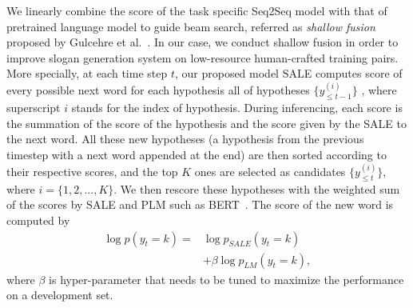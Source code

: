 {We linearly combine the score of the
task specific Seq2Seq model with that of pretrained language model
to guide beam search, referred as \emph{shallow fusion} proposed by
Gulcehre et al.~\cite{gulcehre2015using}.
In our case, we conduct shallow fusion in order to improve slogan generation system
on low-resource human-crafted training pairs. 
More specially, 
at each time step $t$,
our proposed model SALE computes score of every
possible next word for each hypothesis all of hypotheses $\{y^{(i)}_{\le t-1}\}$
, where superscript $i$ stands for the index of hypothesis.
During inferencing, 
each score is the summation of the score of the hypothesis and
the score given by the SALE to the next word.
All these new hypotheses (a hypothesis from the previous timestep with 
a next word appended at the end) are then sorted according to their
respective scores, and the top $K$ ones are selected as candidates
$\{y^{(i)}_{\le t}\}$, where $i = \{1, 2, ..., K\}$.
We then rescore these hypotheses with the weighted sum of the scores
by SALE and PLM such as BERT~\cite{devlin2018bert}.
The score of the new word is computed by
\begin{equation}
\label{eq:shallow_fusion}
\begin{split}
\log p \left( y _ { t } = k \right)  =
	&	\log p_{SALE} \left( y_t = k \right) \\ 
	& + \beta \log p_{LM} \left(y_t = k\right),
\end{split}
\end{equation}
where $\beta$ is hyper-parameter that needs to be tuned to maximize the 
performance on a development set.

%
}

